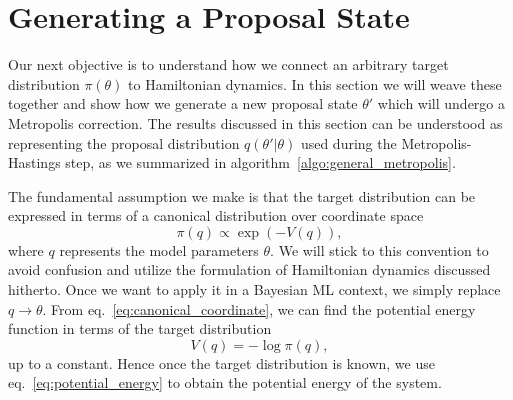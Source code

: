\section{Generating a Proposal State}
Our next objective is to understand how we connect an arbitrary target distribution $\pi(\theta)$
to Hamiltonian dynamics. In this section we will weave these together and show how we
generate a new proposal state $\theta'$ which will undergo a Metropolis correction.
The results discussed in this section can be understood as representing the proposal distribution $q(\theta'|\theta)$ used during the Metropolis-Hastings step,
as we summarized in algorithm~\ref{algo:general_metropolis}. 

The fundamental assumption we make is that the target distribution can be expressed in terms of a
canonical distribution over coordinate space
\begin{equation}\label{eq:canonical_coordinate}
  \pi(q) \propto \exp\left(-V(q)\right),
\end{equation}
where $q$ represents the model parameters $\theta$. We will stick to this convention to avoid confusion and 
utilize the formulation of Hamiltonian dynamics discussed hitherto. Once we want to apply it in a Bayesian ML context,
we simply replace $q \to \theta$. From eq.~\eqref{eq:canonical_coordinate}, we can find the potential
energy function in terms of the target distribution
\begin{equation}\label{eq:potential_energy}
  V(q) = - \log \pi(q),
\end{equation}
up to a constant. Hence once the target distribution is known,
we use eq.~\eqref{eq:potential_energy} to obtain the potential energy of the system.

